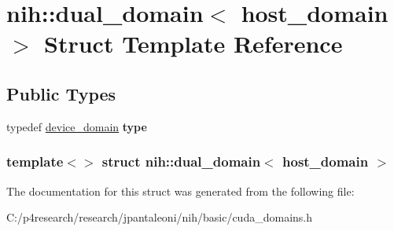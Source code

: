 \hypertarget{structnih_1_1dual__domain_3_01host__domain_01_4}{
\section{nih\-:\-:dual\-\_\-domain$<$ host\-\_\-domain $>$ \-Struct \-Template \-Reference}
\label{structnih_1_1dual__domain_3_01host__domain_01_4}
}
\subsection*{\-Public \-Types}
\begin{DoxyCompactItemize}
\item 
\hypertarget{structnih_1_1dual__domain_3_01host__domain_01_4_a1b085b484878bff1e1ebdb94bcbc9bb9}{
typedef \hyperlink{structnih_1_1device__domain}{device\-\_\-domain} {\bfseries type}}
\label{structnih_1_1dual__domain_3_01host__domain_01_4_a1b085b484878bff1e1ebdb94bcbc9bb9}

\end{DoxyCompactItemize}
\subsubsection*{template$<$$>$ struct nih\-::dual\-\_\-domain$<$ host\-\_\-domain $>$}



\-The documentation for this struct was generated from the following file\-:\begin{DoxyCompactItemize}
\item 
\-C\-:/p4research/research/jpantaleoni/nih/basic/cuda\-\_\-domains.\-h\end{DoxyCompactItemize}
